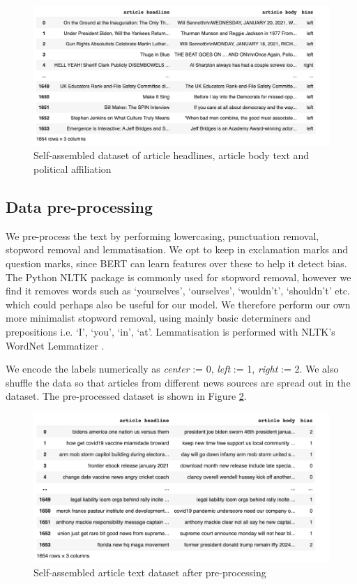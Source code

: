 \begin{figure}
    \centering
    \includegraphics[scale=0.29]{0-img/nmr-bert-data.png}
    \caption{Self-assembled dataset of article headlines, article body text and political affiliation}
    \label{fig:nmr-bert-data}
\end{figure}

\subsection{Data pre-processing}

We pre-process the text by performing lowercasing, punctuation removal, stopword removal and lemmatisation. We opt to keep in exclamation marks and question marks, since BERT can learn features over these to help it detect bias. The Python NLTK \cite{nltk} package is commonly used for stopword removal, however we find it removes words such as `yourselves', `ourselves', `wouldn't', `shouldn't' etc. which could perhaps also be useful for our model. We therefore perform our own more minimalist stopword removal, using mainly basic determiners and prepositions i.e. `I', `you', `in', `at'. Lemmatisation is performed with NLTK's WordNet Lemmatizer \cite{wordnet}.

We encode the labels numerically as \textit{center} := 0, \textit{left} := 1, \textit{right} := 2. We also shuffle the data so that articles from different news sources are spread out in the dataset. The pre-processed dataset is shown in Figure \ref{fig:nmr-bert-data-preprocessed}.

\begin{figure}
    \centering
    \includegraphics[scale=0.32]{0-img/nmr-bert-data-preprocessed.png}
    \caption{Self-assembled article text dataset after pre-processing}
    \label{fig:nmr-bert-data-preprocessed}
\end{figure}

